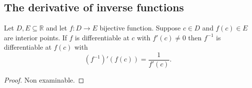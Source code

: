 \subsection{The derivative of inverse functions}


\begin{theorem}
  Let $D, E \subseteq \mathbb{R}$ and let $f : D \rightarrow E$ bijective function. Suppose $c \in D$ and $f(c) \in E$ are interior points. If $f$ is differentiable at $c$ with $f'(c) \not = 0$ then $f^{-1}$ is differentiable at $f(c)$ with
  \[(f^{-1})'(f(c)) = \frac{1}{f'(c)}.\]
\end{theorem}
\begin{proof}
    Non examinable.
\end{proof}

